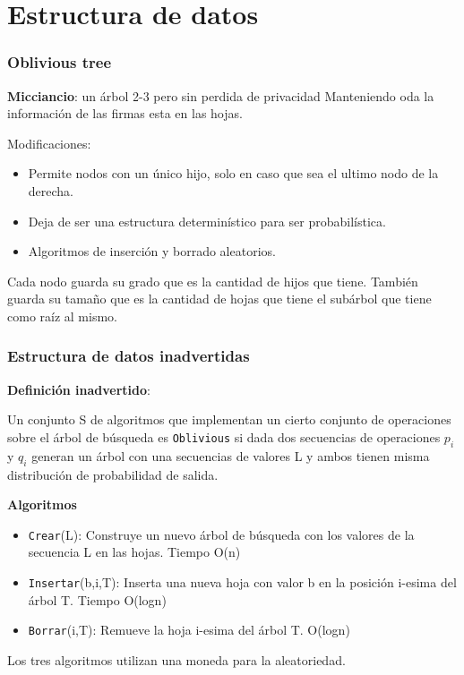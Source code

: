 \documentclass[10pt]{beamer}
\begin{document}

\section{Estructura de datos}
\begin{frame}
\frametitle{Oblivious tree}

\textbf{Micciancio}: un árbol 2-3 pero sin perdida de privacidad Manteniendo oda la información de las firmas esta en las hojas.

Modificaciones:
\begin{itemize}
\pause
  \item Permite nodos con un único hijo, solo en caso que sea el ultimo nodo de la derecha.
\pause
  \item Deja de ser una estructura determinístico para ser probabilística.
  \item Algoritmos de inserción y borrado aleatorios.
\end{itemize}

\pause
Cada nodo guarda su grado que es la cantidad de hijos que tiene.
También guarda su tamaño que es la cantidad de hojas que tiene el subárbol que tiene como
raíz al mismo.
\end{frame}



\begin{frame}
\frametitle{Estructura de datos inadvertidas}

\textbf{Definición inadvertido}:

Un conjunto S de algoritmos que implementan un cierto conjunto de operaciones sobre el árbol de búsqueda es
\texttt{Oblivious} si dada dos secuencias de operaciones $p_i$ y $q_i$ generan un árbol con una secuencias
de valores L y ambos tienen misma distribución de probabilidad de salida.


\pause
\textbf{Algoritmos}
\begin{itemize}
  \item \texttt{Crear}(L): Construye un nuevo árbol de búsqueda con los valores de la secuencia L en las hojas. Tiempo O(n)
\pause
  \item \texttt{Insertar}(b,i,T): Inserta una nueva hoja con valor b en la posición i-esima del árbol T. Tiempo O(logn)
\pause
  \item \texttt{Borrar}(i,T): Remueve la hoja i-esima del árbol T. O(logn)
\end{itemize}

\pause
Los tres algoritmos utilizan una moneda para la aleatoriedad.


\end{frame}
\end{document}
